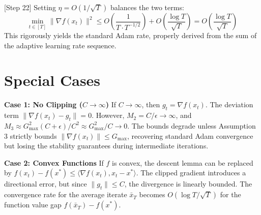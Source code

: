 \documentclass{article}
\begin{document}
[Step 22] Setting $\eta = O(1/\sqrt{T})$ balances the two terms:
$$ \min_{t \in [T]} \|\nabla f(x_t)\|^2 \leq O\left(\frac{1}{T \cdot T^{-1/2}}\right) + O\left(\frac{\log T}{\sqrt{T}}\right) = O\left(\frac{\log T}{\sqrt{T}}\right) $$
This rigorously yields the standard Adam rate, properly derived from the sum of the adaptive learning rate sequence.

\section*{Special Cases}
\textbf{Case 1: No Clipping ($C \to \infty$)}
If $C \to \infty$, then $g_t = \nabla f(x_t)$. The deviation term $\|\nabla f(x_t) - g_t\| = 0$. However, $M_2 = C/\epsilon \to \infty$, and $M_3 \approx G_{\max}^2 (C+\epsilon)/C^2 \approx G_{\max}^2/C \to 0$. The bounds degrade unless Assumption 3 strictly bounds $\|\nabla f(x_t)\| \leq G_{\max}$, recovering standard Adam convergence but losing the stability guarantees during intermediate iterations.

\textbf{Case 2: Convex Functions}
If $f$ is convex, the descent lemma can be replaced by $f(x_t) - f(x^*) \leq \langle \nabla f(x_t), x_t - x^* \rangle$. The clipped gradient introduces a directional error, but since $\|g_t\| \leq C$, the divergence is linearly bounded. The convergence rate for the average iterate $\bar{x}_T$ becomes $O(\log T / \sqrt{T})$ for the function value gap $f(\bar{x}_T) - f(x^*)$.
\end{document}
